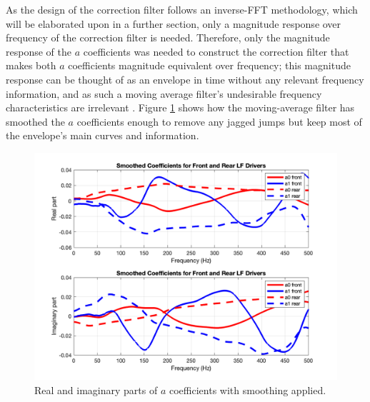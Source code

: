 \documentclass{report}
\begin{document}
            As the design of the correction filter follows an inverse-FFT methodology, which will be elaborated upon in a further section, only a magnitude response over frequency of the correction filter is needed.
            Therefore, only the magnitude response of the $a$ coefficients was needed to construct the correction filter that makes both $a$ coefficients magnitude equivalent over frequency; this magnitude response can be thought of as an envelope in time without any relevant frequency information, and as such a moving average filter's undesirable frequency characteristics are irrelevant \cite{smith2013digital}.
            Figure \ref{acoeffsSmooth} shows how the moving-average filter has smoothed the $a$ coefficients enough to remove any jagged jumps but keep most of the envelope's main curves and information.
            \begin{figure}[H]
                \centering
                \includegraphics[scale=0.35]{figs/acoeffsSmooth.png}%
                \caption{Real and imaginary parts of $a$ coefficients with smoothing applied.}
                \label{acoeffsSmooth}
            \end{figure}
\end{document}
